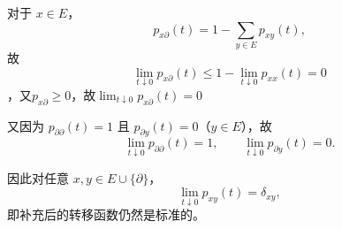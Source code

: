 \documentclass{ctexart}
\begin{document}
\begin{solution}
\begin{enumerate}
      对于 $x\in E$，
      \[
        p_{x\partial}(t)
        =1-\sum_{y\in E}p_{xy}(t),
      \]
      故
      \[
        \lim_{t\downarrow0}p_{x\partial}(t)
        \leq 1-\lim_{t \downarrow 0} p_{xx}(t) = 0
      \]
      ，又\(p_{x \partial } \geq 0  \)，故\(\lim_{t \downarrow 0}p_{x \partial}(t) = 0 \)

      又因为 $p_{\partial\partial}(t)=1$ 且
      $p_{\partial y}(t)=0$（$y\in E$），故
      \[
        \lim_{t\downarrow0}p_{\partial\partial}(t)=1,
        \qquad
        \lim_{t\downarrow0}p_{\partial y}(t)=0.
      \]

      因此对任意 $x,y\in E\cup\{\partial\}$，
      \[
        \lim_{t\downarrow0}p_{xy}(t)=\delta_{xy},
      \]
      即补充后的转移函数仍然是标准的。
  \end{enumerate}
\end{solution}
\end{document}
